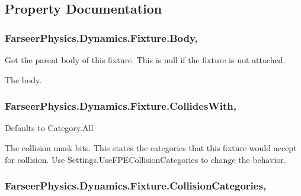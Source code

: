 \subsection{Property Documentation}
\hypertarget{class_farseer_physics_1_1_dynamics_1_1_fixture_a7dd9737c232708f439c50903ec704fac}{
\subsubsection[{Body}]{ Farseer\+Physics.\+Dynamics.\+Fixture.\+Body\hspace{0.3cm}{\ttfamily [get]}, {\ttfamily [set]}}}\label{class_farseer_physics_1_1_dynamics_1_1_fixture_a7dd9737c232708f439c50903ec704fac}


Get the parent body of this fixture. This is null if the fixture is not attached. 

The body.\hypertarget{class_farseer_physics_1_1_dynamics_1_1_fixture_a77d1606d127b819b88bc0c4866763cea}{
\subsubsection[{Collides\+With}]{ Farseer\+Physics.\+Dynamics.\+Fixture.\+Collides\+With\hspace{0.3cm}{\ttfamily [get]}, {\ttfamily [set]}}}\label{class_farseer_physics_1_1_dynamics_1_1_fixture_a77d1606d127b819b88bc0c4866763cea}


Defaults to Category.\+All 

The collision mask bits. This states the categories that this fixture would accept for collision. Use Settings.\+Use\+F\+P\+E\+Collision\+Categories to change the behavior. \hypertarget{class_farseer_physics_1_1_dynamics_1_1_fixture_ad8cb71ed3a90a2ddd9051fe6a293a226}{
\subsubsection[{Collision\+Categories}]{ Farseer\+Physics.\+Dynamics.\+Fixture.\+Collision\+Categories\hspace{0.3cm}{\ttfamily [get]}, {\ttfamily [set]}}}\label{class_farseer_physics_1_1_dynamics_1_1_fixture_ad8cb71ed3a90a2ddd9051fe6a293a226}


